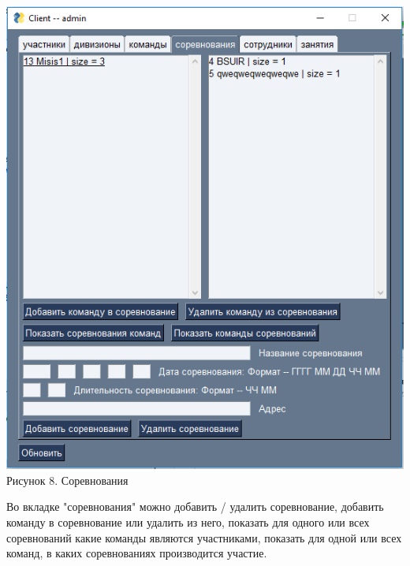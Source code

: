 \documentclass[a4paper,12pt,preview]{report} %
\begin{document}
	\begin{center}
		\includegraphics{competitions.PNG} \\
		Рисунок 8. Соревнования
	\end{center}
	
	Во вкладке "соревнования" можно добавить / удалить соревнование, добавить команду в соревнование или удалить из него, показать для одного или всех соревнований какие команды являются участниками, показать для одной или всех команд, в каких соревнованиях производится участие.
	
	
	
	
	
\end{document}
